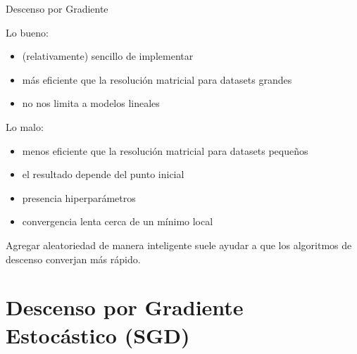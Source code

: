\documentclass[aspectratio=169, usenames,dvipsnames]{beamer}
\begin{document}
\begin{frame}
    \begin{center}
        \Large Descenso por Gradiente
    \end{center}

    Lo bueno:
    \begin{itemize}
        \item (relativamente) sencillo de implementar
        \item más eficiente que la resolución matricial para datasets grandes
        \item no nos limita a modelos lineales
    \end{itemize}
    Lo malo:
    \begin{itemize}
        \item menos eficiente que la resolución matricial para datasets pequeños
        \item el resultado depende del punto inicial
        \item presencia hiperparámetros
        \item convergencia lenta cerca de un mínimo local
    \end{itemize}
    \pause
    Agregar aleatoriedad de manera inteligente suele ayudar a que los algoritmos de descenso converjan más rápido.
\end{frame}

\section{Descenso por Gradiente Estocástico (SGD)}
\end{document}
